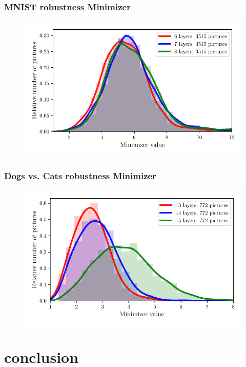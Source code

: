 \documentclass[handout]{beamer}
\begin{document}
\begin{frame}
\frametitle{MNIST robustness Minimizer} 
\begin{figure}
\includegraphics[width=0.9\linewidth]{../figures/plot_mnist_robustness_minimizer.pdf}
\end{figure}
\end{frame}

\begin{frame}
\frametitle{Dogs vs. Cats robustness Minimizer} 
\begin{figure}
\includegraphics[width=0.9\linewidth]{../figures/plot_cats_vs_dogs_robustness_minimizer.pdf}
\end{figure}
\end{frame}

\section{conclusion}
\end{document}
